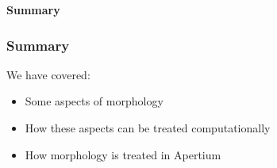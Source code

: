 \documentclass[10pt,xetex]{beamer} %
\begin{document}


\begin{frame} %
 \begin{center}
 {\Large {\bf Summary}}
 \end{center}
\end{frame}

\begin{frame}
  \frametitle{Summary}

We have covered:

\begin{itemize}

  \item Some aspects of morphology

  \item How these aspects can be treated computationally

  \item How morphology is treated in Apertium

\end{itemize}

\end{frame}
\end{document}
